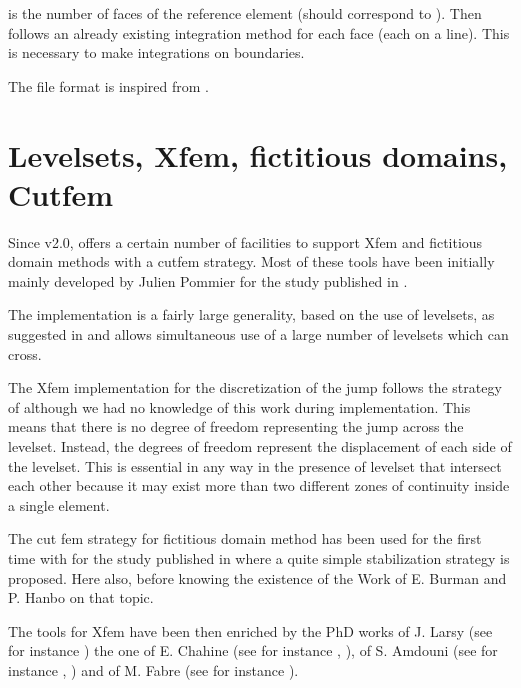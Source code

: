 \documentclass[a4paper,11pt,english]{sphinxmanual}
\begin{document}
 is the number of faces of the reference element (should
correspond to ). Then follows an already existing
integration method for each face (each on a line). This is necessary
to make integrations on boundaries.

The file format is inspired from .


\chapter{Level\sphinxhyphen{}sets, Xfem, fictitious domains, Cut\sphinxhyphen{}fem}
\label{\detokenize{userdoc/xfem:level-sets-xfem-fictitious-domains-cut-fem}}\label{\detokenize{userdoc/xfem:ud-xfem}}\label{\detokenize{userdoc/xfem::doc}}
Since v2.0,  offers a certain number of facilities to support Xfem
and fictitious domain methods with a cut\sphinxhyphen{}fem strategy. Most of these
tools have been initially mainly developed by Julien Pommier for the
study published in .

The implementation is a fairly large generality, based on the use of
level\sphinxhyphen{}sets, as suggested in  and allows simultaneous
use of a large number of level\sphinxhyphen{}sets which can cross.

The Xfem implementation for the discretization of the jump follows
the strategy of  although we had no knowledge of this work
during implementation. This means that there is no degree of freedom
representing the jump across the level\sphinxhyphen{}set. Instead, the degrees of
freedom represent the displacement of each side of the level\sphinxhyphen{}set.
This is essential in any way in the presence of level\sphinxhyphen{}set that
intersect each other because it may exist more than two different
zones of continuity inside a single element.

The cut fem strategy for fictitious domain method has been used for
the first time with  for the study published in  where
a quite simple stabilization strategy is proposed. Here also, before
knowing the existence of the Work of
E. Burman and P. Hanbo  on that topic.

The tools for Xfem have been then enriched by the PhD works
of J. Larsy (see for instance ) the one
of E. Chahine (see for instance , ),
of S. Amdouni  (see for instance , )
and of M. Fabre (see for instance  ).
\end{document}
